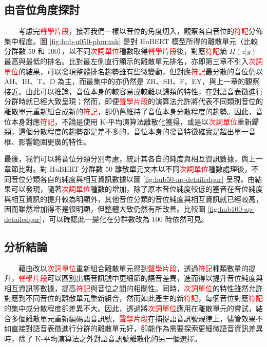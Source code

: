 \subsection{由音位角度探討}

　　考慮完\textcolor{red}{聲學片段}，接著我們一樣以音位的角度切入，觀察各自音位的\textcolor{red}{符記}分佈集中程度。圖 \ref{fig:hub-u050-phnrank} 是對 HuBERT 模型所得的離散單元（比較分群數 50 和 100），以不同\textcolor{red}{次詞單位}種數取得\textcolor{red}{聲學片段}後，對應\textcolor{red}{符記}熵 $H(z|y)$ 最高與最低的排名。比對最左側直行顯示的離散單元排名，亦即第三章不引入\textcolor{red}{次詞單位}的結果，可以發現整體排名趨勢雖有些微變動，但對應\textcolor{red}{符記}最分散的音位仍以 AH、IH、T、D 為主，而最集中的亦仍然是 ZH、SH、F、EY，與上一章的觀察接近。由此可以推論，音位本身的較容易或較難以歸類的特性，在對語音表徵進行分群時就已經大致呈現；然而，即便\textcolor{red}{聲學片段}的演算法允許將代表不同類別音位的離散單元重新組合成新的\textcolor{red}{符記}，卻仍舊維持了音位本身分散程度的趨勢。因此，音位本身對應\textcolor{red}{符記}，不論是使用 K-平均演算法離散化獲得，或是以\textcolor{red}{次詞單位}重新歸類，這個分散程度的趨勢都是差不多的，音位本身的發音特徵確實是超出單一音框、影響範圍更廣的特性。 
  
        最後，我們可以將音位分類分別考慮，統計其各自的純度與相互資訊數據，與上一章節比對。對 HuBERT 分群數 50 離散單元文本以不同\textcolor{red}{次詞單位}種數處理後，不同音位分類各自的純度與相互資訊數據以圖 \ref{fig:hub50-ap-detailedpur} 呈現。由結果可以發現，隨著\textcolor{red}{次詞單位}種數的增加，除了原本音位純度較低的塞音在音位純度與相互資訊的提升較為明顯外，其他音位分類的音位純度與相互資訊就已經較高，因而雖然增加得不是很明顯，但整體大致仍然有所改善。比較圖 \ref{fig:hub100-ap-detailedpur}，可以確認此一變化在分群數改為 100 時依然可見。

\subsection{分析結論}

　　藉由改以\textcolor{red}{次詞單位}重新組合離散單元得到\textcolor{red}{聲學片段}，透過\textcolor{red}{符記}種類數量的提升，\textcolor{red}{聲學片段}可以區別出語音訊號中更細節的語音差異，進而得以提升音位純度與相互資訊等數據，提高\textcolor{red}{符記}與音位之間的相關性。同時，\textcolor{red}{次詞單位}的特性雖然允許對應到不同音位的離散單元重新組合，然而如此產生的新\textcolor{red}{符記}，每個音位對應\textcolor{red}{符記}的集中或分散程度卻差異不大。因此，透過將\textcolor{red}{次詞單位}應用在離散單元的嘗試，結合多個離散單元重新編碼語音訊號，\textcolor{red}{聲學片段}在捕捉語音訊號規律上，儘管效果不如直接對語音表徵進行分群的離散單元好，卻能作為需要探索更細微語音資訊差異時，除了 K-平均演算法之外對語音訊號離散化的另一個選擇。

